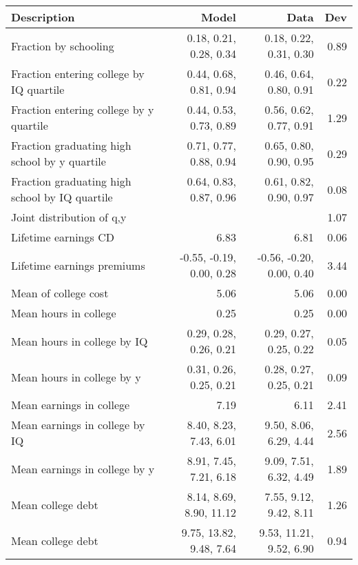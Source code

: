 \begin{tabular}{lrrr}
\hline
Description & Model  & Data  & Dev  \\ 
\hline
Fraction by schooling & 0.18, 0.21, 0.28, 0.34  & 0.18, 0.22, 0.31, 0.30  & 0.89  \\ 
Fraction entering college by IQ quartile & 0.44, 0.68, 0.81, 0.94  & 0.46, 0.64, 0.80, 0.91  & 0.22  \\ 
Fraction entering college by y quartile & 0.44, 0.53, 0.73, 0.89  & 0.56, 0.62, 0.77, 0.91  & 1.29  \\ 
Fraction graduating high school by y quartile & 0.71, 0.77, 0.88, 0.94  & 0.65, 0.80, 0.90, 0.95  & 0.29  \\ 
Fraction graduating high school by IQ quartile & 0.64, 0.83, 0.87, 0.96  & 0.61, 0.82, 0.90, 0.97  & 0.08  \\ 
Joint distribution of q,y &   &   & 1.07  \\ 
Lifetime earnings CD & 6.83  & 6.81  & 0.06  \\ 
Lifetime earnings premiums & -0.55, -0.19, 0.00, 0.28  & -0.56, -0.20, 0.00, 0.40  & 3.44  \\ 
Mean of college cost & 5.06  & 5.06  & 0.00  \\ 
Mean hours in college & 0.25  & 0.25  & 0.00  \\ 
Mean hours in college by IQ & 0.29, 0.28, 0.26, 0.21  & 0.29, 0.27, 0.25, 0.22  & 0.05  \\ 
Mean hours in college by y & 0.31, 0.26, 0.25, 0.21  & 0.28, 0.27, 0.25, 0.21  & 0.09  \\ 
Mean earnings in college & 7.19  & 6.11  & 2.41  \\ 
Mean earnings in college by IQ & 8.40, 8.23, 7.43, 6.01  & 9.50, 8.06, 6.29, 4.44  & 2.56  \\ 
Mean earnings in college by y & 8.91, 7.45, 7.21, 6.18  & 9.09, 7.51, 6.32, 4.49  & 1.89  \\ 
Mean college debt & 8.14, 8.69, 8.90, 11.12  & 7.55, 9.12, 9.42, 8.11  & 1.26  \\ 
Mean college debt & 9.75, 13.82, 9.48, 7.64  & 9.53, 11.21, 9.52, 6.90  & 0.94  \\ 
\hline
\end{tabular}%
